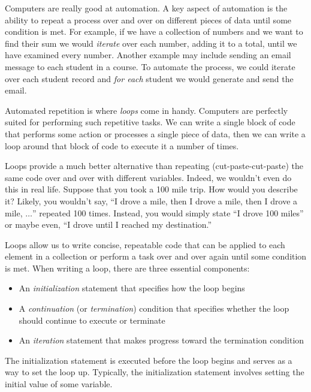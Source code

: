 

Computers are really good at automation.  A key aspect of automation is 
the ability to repeat a process over and over on different pieces of data until some condition
is met.  For example, if we have a collection of numbers and we want to find their
sum we would \emph{iterate} over each number, adding it to a total, until we have
examined every number.  Another example may include sending an email message
to each student in a course.  To automate the process, we could iterate over each
student record and \emph{for each} student we would generate and send the email.

Automated repetition is where \emph{loops} come in handy.  Computers are perfectly suited 
for performing such repetitive tasks.  We can write a single block of code that performs
some action or processes a single piece of data, then we can write a loop around that
block of code to execute it a number of times.

Loops provide a much better alternative than repeating (cut-paste-cut-paste) the same
code over and over with different variables.  Indeed, we wouldn't even do this in real life.
Suppose that you took a 100 mile trip.  How would you describe it?  Likely,
you wouldn't say, ``I drove a mile, then I drove a mile, then I drove a mile, $\ldots$'' repeated
100 times.  Instead, you would simply state ``I drove 100 miles'' or maybe even, ``I drove
until I reached my destination.''  

Loops allow us to write concise, repeatable code that can be applied to each element in 
a collection or perform a task over and over again until some condition is met.  When 
writing a loop, there are three essential components:

\begin{itemize}
  \item An \emph{initialization} statement that specifies how the loop begins
  \item A \emph{continuation} (or \emph{termination}) condition that specifies whether the loop 
  	should continue to execute or terminate
  \item An \emph{iteration} statement that makes progress toward the termination condition
\end{itemize}

The initialization statement is executed before the loop begins and serves as a way
to set the loop up.  Typically, the initialization statement involves setting the initial value 
of some variable.

